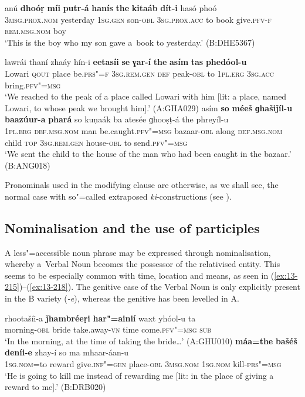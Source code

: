 \ea
\label{ex:13-212}
\gll anú \textbf{dhoóṛ} \textbf{míi} \textbf{putr-á} \textbf{hanís} \textbf{the} \textbf{kitaáb} \textbf{dít-i} hasó phoó\\
\textsc{3msg.prox.nom} yesterday \textsc{1sg.gen} son-\textsc{obl} \textsc{3sg.prox.acc} to  book give.\textsc{pfv-f} \textsc{rem.msg.nom} boy \\
\glt `This is the boy who my son gave a~book to yesterday.' (B:DHE5367)

\ex
\label{ex:13-213}
\gll lawrái thaní zhaáy hín-i    \textbf{eetasíi} \textbf{se} \textbf{ɣar-í} \textbf{the} \textbf{asím} \textbf{tas} \textbf{    phedóol-u}\\
Lowari \textsc{qout} place be.\textsc{prs"=f} \textsc{3sg.rem.gen} \textsc{def} peak-\textsc{obl} to \textsc{1pl.erg} \textsc{3sg.acc} bring.\textsc{pfv"=msg}\\
\glt `We reached to the peak of a place called Lowari with him [lit: a place, named Lowari, to whose peak we brought him].' (A:GHA029)
\ex
\label{ex:13-214}
\gll asím \textbf{so} \textbf{méeš} \textbf{ɡhašiǰíl-u} \textbf{baazúur-a} \textbf{phará} so kuṇaák ba atesée ɡhooṣṭ-á the phreyíl-u\\
\textsc{1pl.erg} \textsc{def.msg.nom} man be.caught.\textsc{pfv"=msg} bazaar-\textsc{obl} along \textsc{def.msg.nom} child \textsc{top} \textsc{3sg.rem.gen} house-\textsc{obl} to send.\textsc{pfv"=msg}\\
\glt `We sent the child to the house of the man who had been caught in the bazaar.' (B:ANG018) 
\z

Pronominals used in the modifying clause are otherwise, as we shall see, the normal case with so"=called extraposed \textit{ki}-constructions (see ). 


\subsection{Nominalisation and the use of participles}
\label{subsec:13-6-6}

A less"=accessible noun phrase may be expressed through nominalisation, whereby a~Verbal Noun becomes the possessor of the relativised entity. This seems to be especially common with time, location and means, as seen in (\ref{ex:13-215})--(\ref{ex:13-218}). The genitive case of the Verbal Noun is only explicitly present in the B variety (\textit{-e}), whereas the genitive has been levelled in A.

\ea
\label{ex:13-215}
\gll rhootašíi-a \textbf{ǰhambréeṛi} \textbf{har"=ainií} waxt  yhóol-u ta \\
morning-\textsc{obl} bride take.away-\textsc{vn} time come.\textsc{pfv"=msg} \textsc{sub} \\
\glt `In the morning, at the time of taking the bride{\ldots}' (A:GHU010)
\ex
\label{ex:13-216}
\gll \textbf{máa=the} \textbf{bašéš} \textbf{deníi-e} zhay-í so  ma mhaar-áan-u\\
\textsc{1sg.nom}=to reward give.\textsc{inf"=gen} place-\textsc{obl} \textsc{3msg.nom} \textsc{1sg.nom} kill-\textsc{prs"=msg}\\
\glt `He is going to kill me instead of rewarding me [lit: in the place of giving a reward to me].' (B:DRB020)

